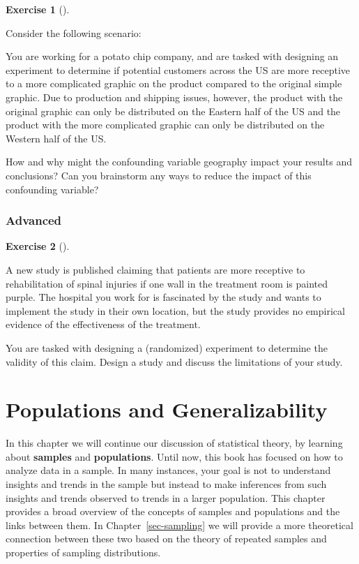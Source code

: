 \documentclass[
  letterpaper,
  DIV=11,
  numbers=noendperiod]{scrreprt}
\theoremstyle{definition}
\newtheorem{exercise}{Exercise}[chapter]
\theoremstyle{remark}
\begin{document}
\begin{exercise}[]\protect\hypertarget{exr-ch07-app2}{}\label{exr-ch07-app2}

Consider the following scenario:

You are working for a potato chip company, and are tasked with designing
an experiment to determine if potential customers across the US are more
receptive to a more complicated graphic on the product compared to the
original simple graphic. Due to production and shipping issues, however,
the product with the original graphic can only be distributed on the
Eastern half of the US and the product with the more complicated graphic
can only be distributed on the Western half of the US.

How and why might the confounding variable geography impact your results
and conclusions? Can you brainstorm any ways to reduce the impact of
this confounding variable?

\end{exercise}

\hypertarget{sec-ex07-advanced}{%
\subsection{Advanced}\label{sec-ex07-advanced}}

\begin{exercise}[]\protect\hypertarget{exr-ch07-adv1}{}\label{exr-ch07-adv1}

A new study is published claiming that patients are more receptive to
rehabilitation of spinal injuries if one wall in the treatment room is
painted purple. The hospital you work for is fascinated by the study and
wants to implement the study in their own location, but the study
provides no empirical evidence of the effectiveness of the treatment.

You are tasked with designing a (randomized) experiment to determine the
validity of this claim. Design a study and discuss the limitations of
your study.

\end{exercise}

\hypertarget{sec-populations}{%
\chapter{Populations and Generalizability}\label{sec-populations}}

In this chapter we will continue our discussion of statistical theory,
by learning about \textbf{samples} and \textbf{populations}. Until now,
this book has focused on how to analyze data in a sample. In many
instances, your goal is not to understand insights and trends in the
sample but instead to make inferences from such insights and trends
observed to trends in a larger population. This chapter provides a broad
overview of the concepts of samples and populations and the links
between them. In Chapter~\ref{sec-sampling} we will provide a more
theoretical connection between these two based on the theory of repeated
samples and properties of sampling distributions.
\end{document}
